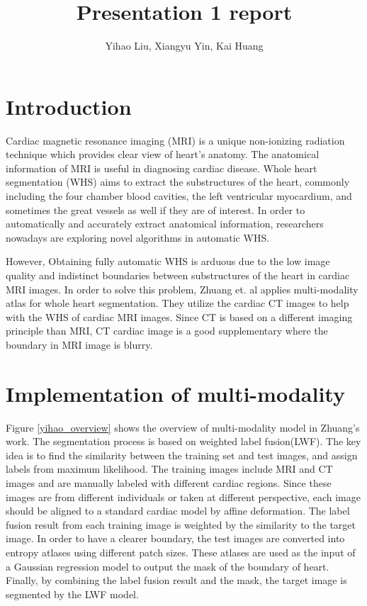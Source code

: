 \documentclass[10pt,sigconf,letterpaper,nonacm]{acmart}
\begin{document}

\thispagestyle{empty}

\title{Presentation 1 report}
\author{Yihao Liu, Xiangyu Yin, Kai Huang}
\date{}
\maketitle

\section{Introduction}
Cardiac magnetic resonance imaging (MRI) is a unique non-ionizing radiation technique which provides clear view of heart’s anatomy. The anatomical information of MRI is useful in diagnosing cardiac disease. Whole heart segmentation (WHS) aims to extract the substructures of the heart, commonly including the four chamber blood cavities, the left ventricular myocardium, and sometimes the great vessels as well if they are of interest\cite{zheng2008four}. In order to automatically and accurately extract anatomical information, researchers nowadays are exploring novel algorithms in automatic WHS. 

However, Obtaining fully automatic WHS is arduous due to the low image quality and indistinct boundaries between substructures of the heart in cardiac MRI images. In order to solve this problem, Zhuang et. al\cite{zhuang2016multi} applies multi-modality atlas for whole heart segmentation. They utilize the cardiac CT images to help with the WHS of cardiac MRI images. Since CT is based on a different imaging principle than MRI, CT cardiac image is a good supplementary where the boundary in MRI image is blurry.  

\section{Implementation of multi-modality}
 Figure \ref{yihao_overview} shows the overview of multi-modality model in Zhuang's work\cite{zhuang2016multi}. The segmentation process is based on weighted label fusion(LWF). The key idea is to find the similarity between the training set and test images, and assign labels from maximum likelihood. The training images include MRI and CT images and are manually labeled with different cardiac regions. Since these images are from different individuals or taken at different perspective, each image should be aligned to a standard cardiac model by affine deformation. The label fusion result from each training image is weighted by the similarity to the target image. In order to have a clearer boundary, the test images are converted into entropy atlases using different patch sizes. These atlases are used as the input of a Gaussian regression model to output the mask of the boundary of heart. Finally, by combining the label fusion result and the mask, the target image is segmented by the LWF model.
 
\end{document}
